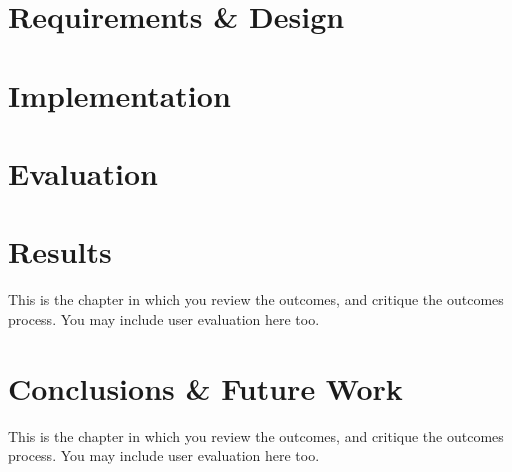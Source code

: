 \documentclass[11pt,openright,a4paper]{report}
\begin{document}
\chapter{Requirements \& Design}
%


\chapter{Implementation}


\chapter{Evaluation}


\chapter{Results}
This is the chapter in which you review the outcomes, and
critique the outcomes process.  You may include user evaluation here
too.

\chapter{Conclusions \& Future Work}
This is the chapter in which you review the outcomes, and
critique the outcomes process.  You may include user evaluation here
too.




\appendix







\begin{landscape}
\begin{multicols}{2}
\end{multicols}
\end{landscape}
\end{document}
